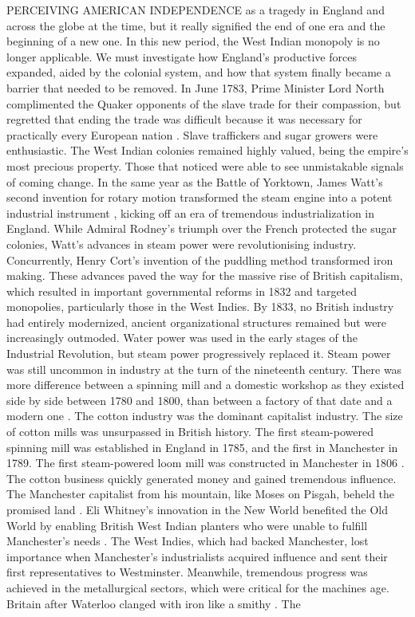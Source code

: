 PERCEIVING AMERICAN INDEPENDENCE as a tragedy in England and across the globe at the time, but it really signified the end of one era and the beginning of a new one. In this new period, the West Indian monopoly is no longer applicable. We must investigate how England's productive forces expanded, aided by the colonial system, and how that system finally became a barrier that needed to be removed. In June 1783, Prime Minister Lord North complimented the Quaker opponents of the slave trade for their compassion, but regretted that ending the trade was difficult because it was necessary for practically every European nation . Slave traffickers and sugar growers were enthusiastic. The West Indian colonies remained highly valued, being the empire's most precious property. Those that noticed were able to see unmistakable signals of coming change. In the same year as the Battle of Yorktown, James Watt's second invention for rotary motion transformed the steam engine into a potent industrial instrument , kicking off an era of tremendous industrialization in England. While Admiral Rodney's triumph over the French protected the sugar colonies, Watt's advances in steam power were revolutionising industry. Concurrently, Henry Cort's invention of the puddling method transformed iron making. These advances paved the way for the massive rise of British capitalism, which resulted in important governmental reforms in 1832 and targeted monopolies, particularly those in the West Indies. By 1833, no British industry had entirely modernized, ancient organizational structures remained but were increasingly outmoded. Water power was used in the early stages of the Industrial Revolution, but steam power progressively replaced it. Steam power was still uncommon in industry at the turn of the nineteenth century. There was more difference between a spinning mill and a domestic workshop as they existed side by side between 1780 and 1800, than between a factory of that date and a modern one . The cotton industry was the dominant capitalist industry. The size of cotton mills was unsurpassed in British history. The first steam-powered spinning mill was established in England in 1785, and the first in Manchester in 1789. The first steam-powered loom mill was constructed in Manchester in 1806 . The cotton business quickly generated money and gained tremendous influence. The Manchester capitalist from his mountain, like Moses on Pisgah, beheld the promised land . Eli Whitney's innovation in the New World benefited the Old World by enabling British West Indian planters who were unable to fulfill Manchester's needs . The West Indies, which had backed Manchester, lost importance when Manchester's industrialists acquired influence and sent their first representatives to Westminster. Meanwhile, tremendous progress was achieved in the metallurgical sectors, which were critical for the machines age. Britain after Waterloo clanged with iron like a smithy . The 